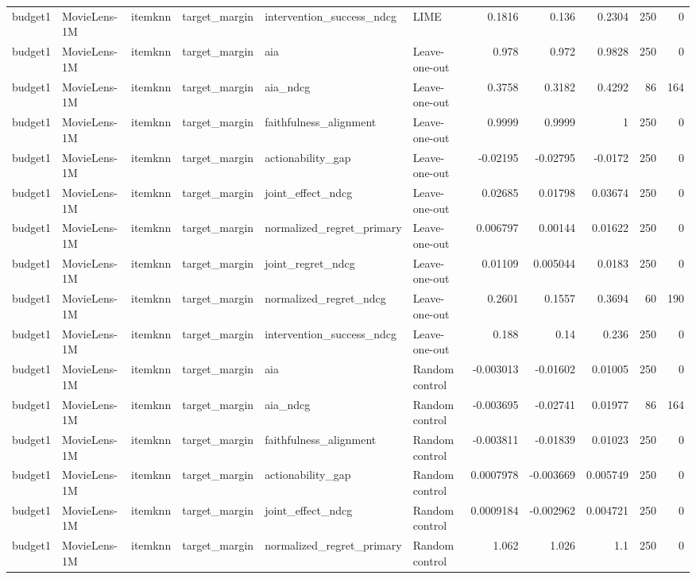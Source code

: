\begin{table}[t]
{\begin{tabular}{llllllrrrrr}
budget1 & MovieLens-1M & itemknn & target\_margin & intervention\_success\_ndcg & LIME & 0.1816 & 0.136 & 0.2304 & 250 & 0 \\
budget1 & MovieLens-1M & itemknn & target\_margin & aia & Leave-one-out & 0.978 & 0.972 & 0.9828 & 250 & 0 \\
budget1 & MovieLens-1M & itemknn & target\_margin & aia\_ndcg & Leave-one-out & 0.3758 & 0.3182 & 0.4292 & 86 & 164 \\
budget1 & MovieLens-1M & itemknn & target\_margin & faithfulness\_alignment & Leave-one-out & 0.9999 & 0.9999 & 1 & 250 & 0 \\
budget1 & MovieLens-1M & itemknn & target\_margin & actionability\_gap & Leave-one-out & -0.02195 & -0.02795 & -0.0172 & 250 & 0 \\
budget1 & MovieLens-1M & itemknn & target\_margin & joint\_effect\_ndcg & Leave-one-out & 0.02685 & 0.01798 & 0.03674 & 250 & 0 \\
budget1 & MovieLens-1M & itemknn & target\_margin & normalized\_regret\_primary & Leave-one-out & 0.006797 & 0.00144 & 0.01622 & 250 & 0 \\
budget1 & MovieLens-1M & itemknn & target\_margin & joint\_regret\_ndcg & Leave-one-out & 0.01109 & 0.005044 & 0.0183 & 250 & 0 \\
budget1 & MovieLens-1M & itemknn & target\_margin & normalized\_regret\_ndcg & Leave-one-out & 0.2601 & 0.1557 & 0.3694 & 60 & 190 \\
budget1 & MovieLens-1M & itemknn & target\_margin & intervention\_success\_ndcg & Leave-one-out & 0.188 & 0.14 & 0.236 & 250 & 0 \\
budget1 & MovieLens-1M & itemknn & target\_margin & aia & Random control & -0.003013 & -0.01602 & 0.01005 & 250 & 0 \\
budget1 & MovieLens-1M & itemknn & target\_margin & aia\_ndcg & Random control & -0.003695 & -0.02741 & 0.01977 & 86 & 164 \\
budget1 & MovieLens-1M & itemknn & target\_margin & faithfulness\_alignment & Random control & -0.003811 & -0.01839 & 0.01023 & 250 & 0 \\
budget1 & MovieLens-1M & itemknn & target\_margin & actionability\_gap & Random control & 0.0007978 & -0.003669 & 0.005749 & 250 & 0 \\
budget1 & MovieLens-1M & itemknn & target\_margin & joint\_effect\_ndcg & Random control & 0.0009184 & -0.002962 & 0.004721 & 250 & 0 \\
budget1 & MovieLens-1M & itemknn & target\_margin & normalized\_regret\_primary & Random control & 1.062 & 1.026 & 1.1 & 250 & 0 \\

\end{tabular}}
\end{table}

